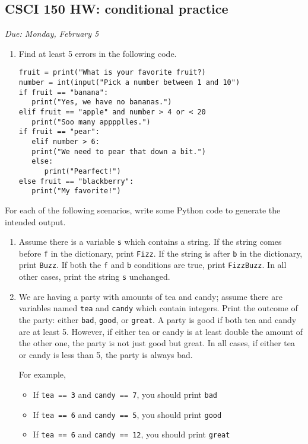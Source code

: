\documentclass[]{article}
\date{}
\providecommand{\tightlist}{%
  \setlength{\itemsep}{0pt}\setlength{\parskip}{0pt}}
\begin{document}
\subsection{CSCI 150 HW: conditional
practice}\label{csci-150-hw-conditional-practice}

\emph{Due: Monday, February 5}

\begin{enumerate}
\def\labelenumi{\arabic{enumi}.}
\item
  Find at least 5 errors in the following code.

\begin{verbatim}
fruit = print("What is your favorite fruit?)
number = int(input("Pick a number between 1 and 10")
if fruit == "banana":
   print("Yes, we have no bananas.")
elif fruit == "apple" and number > 4 or < 20
   print("Soo many apppplles.")
if fruit == "pear":
   elif number > 6:
   print("We need to pear that down a bit.")
   else:
      print("Pearfect!")
else fruit == "blackberry":
   print("My favorite!")
\end{verbatim}
\end{enumerate}

For each of the following scenarios, write some Python code to generate
the intended output.

\begin{enumerate}
\def\labelenumi{\arabic{enumi}.}
\setcounter{enumi}{1}
\item
  Assume there is a variable \texttt{s} which contains a string. If the
  string comes before \texttt{f} in the dictionary, print \texttt{Fizz}.
  If the string is after \texttt{b} in the dictionary, print
  \texttt{Buzz}. If both the \texttt{f} and \texttt{b} conditions are
  true, print \texttt{FizzBuzz}. In all other cases, print the string
  \texttt{s} unchanged.
\item
  We are having a party with amounts of tea and candy; assume there are
  variables named \texttt{tea} and \texttt{candy} which contain
  integers. Print the outcome of the party: either \texttt{bad},
  \texttt{good}, or \texttt{great}. A party is good if both tea and
  candy are at least 5. However, if either tea or candy is at least
  double the amount of the other one, the party is not just good but
  great. In all cases, if either tea or candy is less than 5, the party
  is always bad.

  For example,

  \begin{itemize}
  \tightlist
  \item
    If \texttt{tea\ ==\ 3} and \texttt{candy\ ==\ 7}, you should print
    \texttt{bad}
  \item
    If \texttt{tea\ ==\ 6} and \texttt{candy\ ==\ 5}, you should print
    \texttt{good}
  \item
    If \texttt{tea\ ==\ 6} and \texttt{candy\ ==\ 12}, you should print
    \texttt{great}
  \end{itemize}
\end{enumerate}
\end{document}

